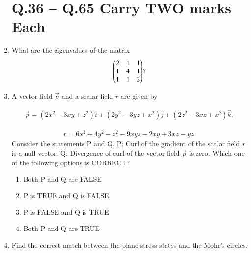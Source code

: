 \documentclass[journal]{IEEEtran}
\begin{document}
\begin{enumerate}
\section*{Q.36 -- Q.65 Carry TWO marks Each}

\item What are the eigenvalues of the matrix  
\begin{align}
\myvec{$2$ & $1$ & $1$ \\ $1$ & $4$ & $1$ \\ $1$ & $1$ & $2$} ?
\end{align}

\hfill {}  
\begin{enumerate}
\end{enumerate}

\item A vector field $\vec{p}$ and a scalar field $r$ are given by  

\begin{align}
\vec{p} = (2x^2 - 3xy + z^2)\hat{i} + (2y^2 - 3yz + x^2)\hat{j} + (2z^2 - 3xz + x^2)\hat{k}, 
\end{align}

 
\begin{align}
r = 6x^2 + 4y^2 - z^2 - 9xyz - 2xy + 3xz - yz.
\end{align}
Consider the statements P and Q.  
P: Curl of the gradient of the scalar field $r$ is a null vector.  
Q: Divergence of curl of the vector field $\vec{p}$ is zero.  
Which one of the following options is CORRECT?  
\hfill {}  
\begin{enumerate}
\item Both P and Q are FALSE
\item P is TRUE and Q is FALSE
\item P is FALSE and Q is TRUE
\item Both P and Q are TRUE
\end{enumerate}

\item Find the correct match between the plane stress states and the Mohr's circles.


\end{enumerate}
\end{document}
